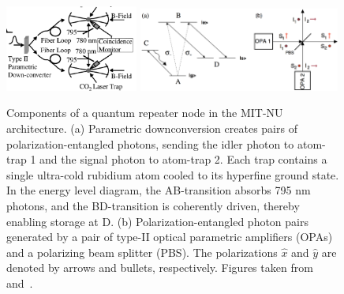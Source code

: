 \documentclass[aps,twocolumn,secnumarabic,amsmath,amssymb,pra,groupedaddress,
showpacs, showkeys]{revtex4-1}
\begin{document}
\begin{figure}[t]
	\centering
	\includegraphics[width=0.39\textwidth]{figures/node}
  	\includegraphics[width=0.59\textwidth]{figures/level_structure_opa1}
	\caption{Components of a quantum repeater node in the MIT-NU architecture. (a) Parametric downconversion creates pairs of polarization-entangled photons, sending the idler photon to atom-trap 1 and the signal photon to atom-trap 2. Each trap contains a single ultra-cold rubidium atom cooled to its hyperfine ground state. In the energy level diagram, the AB-transition absorbs 795 nm photons, and the BD-transition is coherently driven, thereby enabling storage at D. (b) Polarization-entangled photon pairs generated by a pair of type-II optical parametric amplifiers (OPAs) and a polarizing beam splitter (PBS). The polarizations $\hat{x}$ and $\hat{y}$ are denoted by arrows and bullets, respectively. Figures taken from~\cite{PhysRevLett.87.167903} and~\cite{1464-4266-2-1-101}.}
	\label{fig:diagram}
\end{figure}
\end{document}

